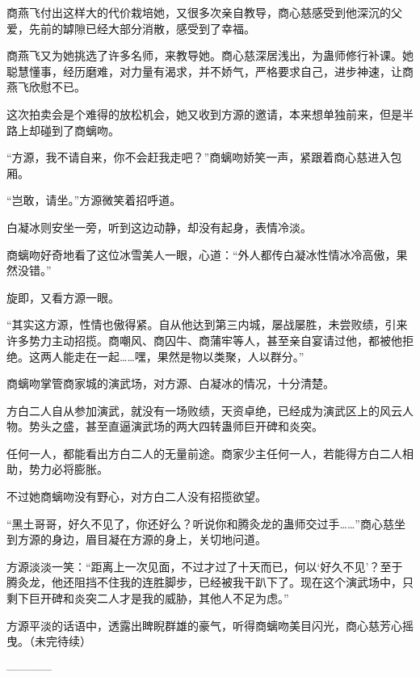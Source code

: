 \begin{this_body}
商燕飞付出这样大的代价栽培她，又很多次亲自教导，商心慈感受到他深沉的父爱，先前的罅隙已经大部分消散，感受到了幸福。

商燕飞又为她挑选了许多名师，来教导她。商心慈深居浅出，为蛊师修行补课。她聪慧懂事，经历磨难，对力量有渴求，并不娇气，严格要求自己，进步神速，让商燕飞欣慰不已。

这次拍卖会是个难得的放松机会，她又收到方源的邀请，本来想单独前来，但是半路上却碰到了商螭吻。

“方源，我不请自来，你不会赶我走吧？”商螭吻娇笑一声，紧跟着商心慈进入包厢。

“岂敢，请坐。”方源微笑着招呼道。

白凝冰则安坐一旁，听到这边动静，却没有起身，表情冷淡。

商螭吻好奇地看了这位冰雪美人一眼，心道：“外人都传白凝冰性情冰冷高傲，果然没错。”

旋即，又看方源一眼。

“其实这方源，性情也傲得紧。自从他达到第三内城，屡战屡胜，未尝败绩，引来许多势力主动招揽。商嘲风、商囚牛、商蒲牢等人，甚至亲自宴请过他，都被他拒绝。这两人能走在一起……嘿，果然是物以类聚，人以群分。”

商螭吻掌管商家城的演武场，对方源、白凝冰的情况，十分清楚。

方白二人自从参加演武，就没有一场败绩，天资卓绝，已经成为演武区上的风云人物。势头之盛，甚至直逼演武场的两大四转蛊师巨开碑和炎突。

任何一人，都能看出方白二人的无量前途。商家少主任何一人，若能得方白二人相助，势力必将膨胀。

不过她商螭吻没有野心，对方白二人没有招揽欲望。

“黑土哥哥，好久不见了，你还好么？听说你和腾灸龙的蛊师交过手……”商心慈坐到方源的身边，眉目凝在方源的身上，关切地问道。

方源淡淡一笑：“距离上一次见面，不过才过了十天而已，何以‘好久不见’？至于腾灸龙，他还阻挡不住我的连胜脚步，已经被我干趴下了。现在这个演武场中，只剩下巨开碑和炎突二人才是我的威胁，其他人不足为虑。”

方源平淡的话语中，透露出睥睨群雄的豪气，听得商螭吻美目闪光，商心慈芳心摇曳。（未完待续）

------------

\end{this_body}

